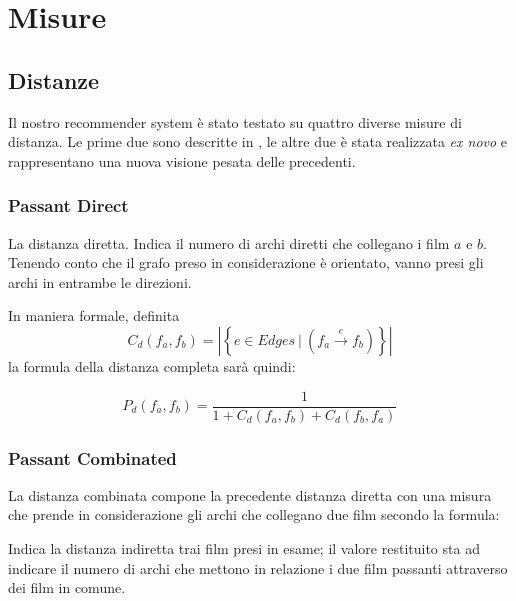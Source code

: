 \section{Misure}

\subsection{Distanze}

Il nostro recommender system è stato testato su quattro diverse misure di distanza.
Le prime due sono descritte in \citet{passant2010measuring}, le altre due è stata realizzata \emph{ex novo} e rappresentano una nuova visione pesata delle precedenti.


\subsubsection{Passant Direct}
\label{PassantD}
La distanza diretta. Indica il numero di archi diretti che collegano i film $a$ e $b$. Tenendo conto che il grafo preso in considerazione è orientato, vanno presi gli archi in entrambe le direzioni.

In maniera formale, definita $$C_{d}(f_a,f_b) = \left\vert \left\{ e \in Edges \  | \  (f_a \xrightarrow{~e~} f_b ) \right\} \right\vert$$ la formula della distanza completa sarà quindi:


    \begin{equation}
        P_{d}(f_{a},f_{b}) = \frac{1} {1+C_{d}(f_{a},f_{b})+C_{d}(f_{b},f_{a})}
    \end{equation}

\subsubsection{Passant Combinated}
\label{PassantC}

La distanza combinata compone la precedente distanza diretta con una misura che
prende in considerazione gli archi che collegano due film  secondo la formula:

Indica la distanza indiretta trai film presi in esame; il valore restituito sta
ad indicare il numero di archi che mettono in relazione i due film passanti attraverso dei film in comune.

